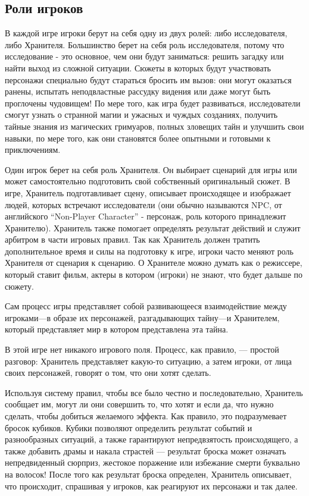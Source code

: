 \documentclass[letterpaper,twocolumn,openany, twoside, 8pt, usenames]{cocbook}
\begin{document}
\subsection*{\nohyphens{Роли игроков}}

В каждой игре игроки берут на себя одну из двух ролей: либо исследователя, либо Хранителя. Большинство берет на себя роль исследователя, потому что исследование - это основное, чем они будут заниматься: решить загадку или найти выход из сложной ситуации. Сюжеты в которых будут участвовать персонажи специально будут стараться бросить им вызов: они могут оказаться ранены, испытать неподвластные рассудку видения или даже могут быть проглочены чудовищем! По мере того, как игра будет развиваться, исследователи смогут узнать о странной магии и ужасных и чуждых созданиях, получить тайные знания из магических гримуаров, полных зловещих тайн и улучшить свои навыки, по мере того, как они становятся более опытными и готовыми к приключениям.

Один игрок берет на себя роль Хранителя. Он выбирает сценарий для игры или может самостоятельно подготовить свой собственный оригинальный сюжет. В игре, Хранитель подготавливает сцену, описывает происходящее и изображает людей, которых встречают исследователи (они обычно называются NPC, от английского ``Non-Player Character'' - персонаж, роль которого принадлежит Хранителю). Хранитель также помогает определять результат действий и служит арбитром в части игровых правил. Так как Хранитель должен тратить дополнительное время и силы на подготовку к игре, игроки часто меняют роль Хранителя от сценария к сценарию. О Хранителе можно думать как о режиссере, который ставит фильм, актеры в котором (игроки) не знают, что будет дальше по сюжету.

Сам процесс игры представляет собой развивающееся взаимодействие между игроками---в образе их персонажей, разгадывающих тайну---и Хранителем, который представляет мир в котором представлена эта тайна.

В этой игре нет никакого игрового поля. Процесс, как правило, --- простой разговор: Хранитель представляет какую-то ситуацию, а затем игроки, от лица своих персонажей, говорят о том, что они хотят сделать.

Используя систему правил, чтобы все было честно и последовательно, Хранитель сообщает им, могут ли они совершить то, что хотят и если да, что нужно сделать, чтобы добиться желаемого эффекта. Как правило, это подразумевает бросок кубиков. Кубики позволяют определить результат событий и разнообразных ситуаций, а также гарантируют непредвзятость происходящего, а также добавить драмы и накала страстей --- результат броска может означать непредвиденный сюрприз, жестокое поражение или избежание смерти буквально на волосок! После того как результат броска определен, Хранитель описывает, что происходит, спрашивая у игроков, как реагируют их персонажи и так далее.
\end{document}
